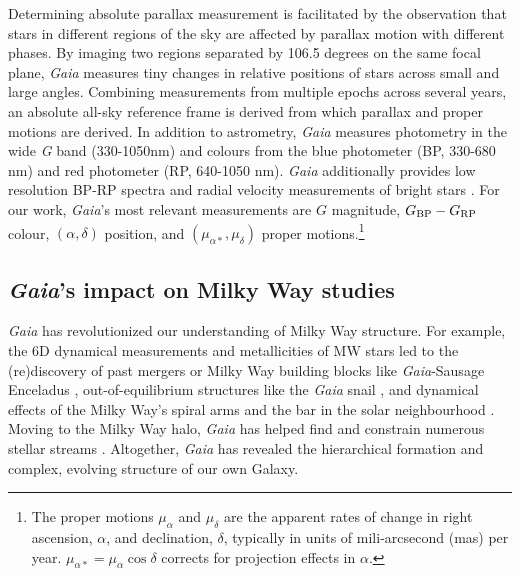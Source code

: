 Determining absolute parallax measurement is facilitated by the
observation that stars in different regions of the sky are affected by
parallax motion with different phases. By imaging two regions separated
by 106.5 degrees on the same focal plane, \emph{Gaia} measures tiny
changes in relative positions of stars across small and large angles.
Combining measurements from multiple epochs across several years, an
absolute all-sky reference frame is derived from which parallax and
proper motions are derived. In addition to astrometry, \emph{Gaia}
measures photometry in the wide \emph{G} band (330-1050nm) and colours
from the blue photometer (BP, 330-680 nm) and red photometer (RP,
640-1050 nm). \emph{Gaia} additionally provides low resolution BP-RP
spectra and radial velocity measurements of bright stars \citep[of
magnitudes \(G_{\rm RVS} < 16\),][]{gaiacollaboration+2016}. For our
work, \emph{Gaia}'s most relevant measurements are \(G\) magnitude,
\(G_{\rm BP} - G_{\rm RP}\) colour, \((\alpha, \delta)\) position, and
\((\mu_{\alpha*}, \mu_\delta)\) proper motions.\footnote{The proper
  motions \(\mu_\alpha\) and \(\mu_\delta\) are the apparent rates of
  change in right ascension, \(\alpha\), and declination, \(\delta\),
  typically in units of mili-arcsecond (mas) per year.
  \(\mu_{\alpha*} = \mu_\alpha \cos \delta\) corrects for projection
  effects in \(\alpha\).}

\subsection{\texorpdfstring{\emph{Gaia}'s impact on Milky Way
studies}{Gaia's impact on Milky Way studies}}\label{gaias-impact-on-milky-way-studies}

\emph{Gaia} has revolutionized our understanding of Milky Way structure.
For example, the 6D dynamical measurements and metallicities of MW stars
led to the (re)discovery of past mergers or Milky Way building blocks
like \emph{Gaia}-Sausage Enceladus
\citetext{\citealp[e.g.,][]{helmi+2018}; \citealp{belokurov+2018}; \citealp[but
see also][]{meza+2005}}, out-of-equilibrium structures like the
\emph{Gaia} snail \citep[e.g.,][]{antoja+2018}, and dynamical effects of
the Milky Way's spiral arms and the bar in the solar neighbourhood
\citep[ and references therein]{hunt+vasiliev2025}. Moving to the Milky
Way halo, \emph{Gaia} has helped find and constrain numerous stellar
streams \citep{ibata+malhan+martin2019, bonaca+price-whelan2025}.
Altogether, \emph{Gaia} has revealed the hierarchical formation and
complex, evolving structure of our own Galaxy.

